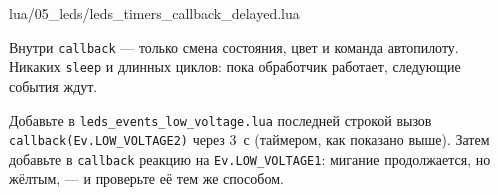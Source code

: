 \begin{codefile}{lua/05_leds/leds_timers_callback_delayed.lua}
\end{codefile}

\begin{rulebox}
Внутри \verb|callback| --- только смена состояния, цвет и команда автопилоту. Никаких \verb|sleep| и длинных циклов: пока обработчик работает, следующие события ждут.
\end{rulebox}

\begin{taskbox}
Добавьте в \texttt{leds\_events\_low\_voltage.lua} последней строкой вызов \verb|callback(Ev.LOW_VOLTAGE2)| через 3~с (таймером, как показано выше). Затем добавьте в \verb|callback| реакцию на \verb|Ev.LOW_VOLTAGE1|: мигание продолжается, но жёлтым, --- и проверьте её тем же способом.
\end{taskbox}
